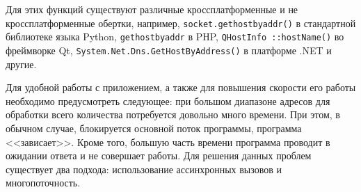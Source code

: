 \documentclass[a4paper]{article}
\begin{document}
\begin{itemize}
			\end{itemize}
			
			Для этих функций существуют различные кроссплатформенные и не кроссплатформенные обертки, например, \texttt{socket.gethostbyaddr()} в стандартной библиотеке языка Python, \texttt{gethostbyaddr} в PHP, \texttt{QHostInfo ::hostName()} во фреймворке Qt, \texttt{System.Net.Dns.GetHostByAddress()} в платформе .NET и другие.
			
			
			Для удобной работы с приложением, а также для повышения скорости его работы необходимо предусмотреть следующее: при большом диапазоне адресов для обработки всего количества потребуется довольно много времени. При этом, в обычном случае, блокируется основной поток программы, программа <<зависает>>. Кроме того, большую часть времени программа проводит в ожидании ответа и не совершает работы. Для решения данных проблем существует два подхода: использование ассинхронных вызовов и многопоточность.
			
\end{document}
